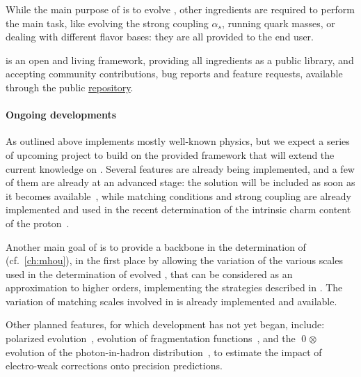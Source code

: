 While the main purpose of \eko{} is to evolve \pdfs, other \qcd{} ingredients
are required to perform the main task, like evolving the strong coupling
$\alpha_s$, running quark masses, or dealing with different flavor bases: they
are all provided to the end user.

\eko{} is an open and living framework, providing all ingredients as a public
library, and accepting community contributions, bug reports and feature
requests, available through the public \eko{}
\href{https://github.com/N3PDF/eko/}{repository}.

\paragraph{Ongoing developments} As outlined above \eko{} implements mostly
well-known physics, but we expect a series of upcoming project to build on the
provided framework that will extend the current knowledge on \pdfs.
Several features are already being implemented, and a few of them are already
at an advanced stage: the \nnnlo{} solution will be included as soon as it
becomes available~\cite{Moch:2021qrk}, while \nnnlo{} matching conditions and
strong coupling are already implemented and used in the recent determination of
the intrinsic charm content of the proton~\cite{Ball:2022qks}.

Another main goal of \eko{} is to provide a backbone in the determination of
\mhou{} (cf.\ \cref{ch:mhou}), in the first place by allowing the variation of
the various scales used in the determination of evolved \pdfs, that can be
considered as an approximation to higher orders, implementing the strategies
described in \cite{AbdulKhalek:2019ihb}.
The variation of matching scales involved in \vfns{} is already implemented and
available.

Other planned features, for which development has not yet began, include:
polarized evolution~\cite{Vogt:2008yw,Vogt:2014pha,Blumlein:2021ryt}, evolution
of fragmentation functions~\cite{Mitov:2006ic,Moch:2007tx,Almasy:2011eq}, and
the \qed$\otimes$\qcd{} evolution of the photon-in-hadron
distribution~\cite{Bertone:2017bme,Xie:2021equ,Cridge:2021pxm}, to estimate the
impact of electro-weak corrections onto precision predictions. 
